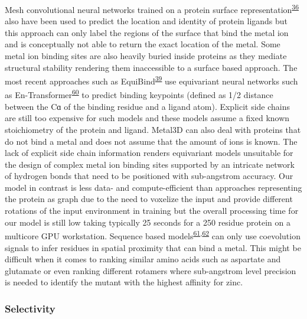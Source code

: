 \documentclass[  ASAPversion,
  ,
  9pt]{elife}
\begin{document}
Mesh convolutional neural networks trained on a protein surface representation\textsuperscript{\protect\hyperlink{ref-yBhqGkBa}{36}} also have been used to predict the location and identity of protein ligands but this approach can only label the regions of the surface that bind the metal ion and is conceptually not able to return the exact location of the metal. Some metal ion binding sites are also heavily buried inside proteins as they mediate structural stability rendering them inaccessible to a surface based approach. The most recent approaches such as EquiBind\textsuperscript{\protect\hyperlink{ref-13hjzBbje}{39}} use equivariant neural networks such as En-Transformer\textsuperscript{\protect\hyperlink{ref-Fc42fl1x}{60}} to predict binding keypoints (defined as 1/2 distance between the Cɑ of the binding residue and a ligand atom). Explicit side chains are still too expensive for such models and these models assume a fixed known stoichiometry of the protein and ligand. Metal3D can also deal with proteins that do not bind a metal and does not assume that the amount of ions is known. The lack of explicit side chain information renders equivariant models unsuitable for the design of complex metal ion binding sites supported by an intricate network of hydrogen bonds that need to be positioned with sub-angstrom accuracy. Our model in contrast is less data- and compute-efficient than approaches representing the protein as graph due to the need to voxelize the input and provide different rotations of the input environment in training but the overall processing time for our model is still low taking typically 25 seconds for a 250 residue protein on a multicore GPU workstation.
Sequence based models\textsuperscript{\protect\hyperlink{ref-cbwvbkS6}{61},\protect\hyperlink{ref-Gj0pG9O5}{62}} can only use coevolution signals to infer residues in spatial proximity that can bind a metal. This might be difficult when it comes to ranking similar amino acids such as aspartate and glutamate or even ranking different rotamers where sub-angstrom level precision is needed to identify the mutant with the highest affinity for zinc.

\hypertarget{selectivity}{%
\subsubsection{Selectivity}\label{selectivity}}
\end{document}
